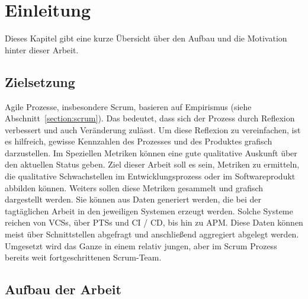 \chapter{Einleitung}

Dieses Kapitel gibt eine kurze Übersicht über den Aufbau und die Motivation hinter dieser Arbeit.

\section{Zielsetzung}

Agile Prozesse, insbesondere Scrum, basieren auf Empirismus (siehe Abschnitt~\ref{section:scrum}).
Das bedeutet, dass sich der Prozess durch Reflexion verbessert und auch Veränderung zulässt.
Um diese Reflexion zu vereinfachen, ist es hilfreich, gewisse Kennzahlen des Prozesses und des Produktes grafisch darzustellen.
Im Speziellen Metriken können eine gute qualitative Auskunft über den aktuellen Status geben.
Ziel dieser Arbeit soll es sein, Metriken zu ermitteln, die qualitative Schwachstellen im Entwicklungsprozess oder im Softwareprodukt abbilden können.
Weiters sollen diese Metriken gesammelt und grafisch dargestellt werden.
Sie können aus Daten generiert werden, die bei der tagtäglichen Arbeit in den jeweiligen Systemen erzeugt werden.
Solche Systeme reichen von \acfp{VCS}, über \acfp{PTS} und \acf{CI} / \acf{CD}, bis hin zu \acf{APM}.
Diese Daten können meist über Schnittstellen abgefragt und anschließend aggregiert abgelegt werden.
Umgesetzt wird das Ganze in einem relativ jungen, aber im Scrum Prozess bereits weit fortgeschrittenen Scrum-Team.

\clearpage
\section{Aufbau der Arbeit}

